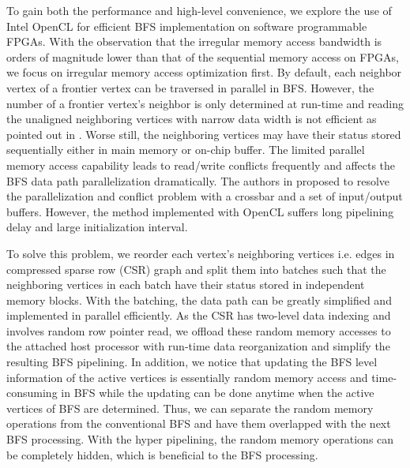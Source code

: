 To gain both the performance and high-level convenience, we explore the use of 
Intel OpenCL for efficient BFS implementation on software programmable FPGAs.
With the observation that the irregular memory access bandwidth is orders of magnitude 
lower than that of the sequential memory access on FPGAs, we focus on irregular 
memory access optimization first. By default, each neighbor vertex of a frontier 
vertex can be traversed in parallel in BFS.
However, the number of a frontier vertex's neighbor is only determined at run-time 
and reading the unaligned neighboring vertices with narrow data width is not efficient 
as pointed out in \cite{wang2017multikernel}. Worse still, the neighboring vertices 
may have their status stored sequentially either in main memory or on-chip buffer.
The limited parallel memory access capability leads to read/write conflicts 
frequently and affects the BFS data path parallelization dramatically. 
The authors in \cite{ham2016graphicionado} 
proposed to resolve the parallelization and conflict problem with a 
crossbar and a set of input/output buffers. However, the method implemented 
with OpenCL suffers long pipelining delay and large initialization interval. 

To solve this problem, we reorder each vertex's neighboring vertices i.e. 
edges in compressed sparse row (CSR) graph and split them into 
batches such that the neighboring vertices 
in each batch have their status stored in independent memory blocks. 
With the batching, the data path can be greatly simplified and implemented 
in parallel efficiently. As the CSR has two-level data indexing and involves 
random row pointer read, we offload these random memory accesses to the attached 
host processor with run-time data reorganization and simplify the resulting BFS pipelining.
In addition, we notice that updating the BFS level information of the 
active vertices is essentially random memory access and time-consuming 
in BFS while the updating can be done anytime when the active vertices of BFS 
are determined. Thus, we can separate the random memory operations from
the conventional BFS and have them overlapped with the next BFS processing. 
With the hyper pipelining, the random memory operations can be completely 
hidden, which is beneficial to the BFS processing.

